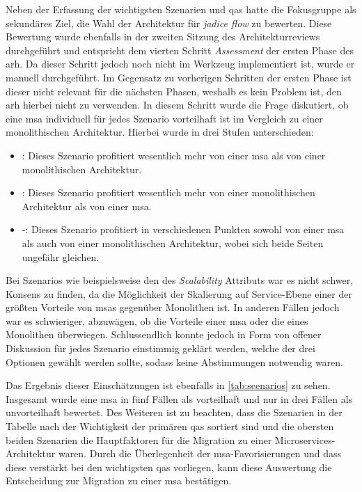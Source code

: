 Neben der Erfassung der wichtigsten Szenarien und \glspl{qa} hatte die Fokusgruppe als sekundäres Ziel, die Wahl der Architektur für \emph{jadice flow} zu bewerten.
Diese Bewertung wurde ebenfalls in der zweiten Sitzung des Architekturreviews durchgeführt und entspricht dem vierten Schritt \emph{Assessment} der ersten Phase des \gls{arh}.
Da dieser Schritt jedoch noch nicht im Werkzeug implementiert ist, wurde er manuell durchgeführt.
Im Gegensatz zu vorherigen Schritten der ersten Phase ist dieser nicht relevant für die nächsten Phasen, weshalb es kein Problem ist, den \gls{arh} hierbei nicht zu verwenden.
In diesem Schritt wurde die Frage diskutiert, ob eine \acrlong{msa} individuell für jedes Szenario vorteilhaft ist im Vergleich zu einer monolithischen Architektur.
Hierbei wurde in drei Stufen unterschieden:
\begin{itemize}
	\item \advantage\hspace*{0.1cm}: Dieses Szenario profitiert wesentlich mehr von einer \gls{msa} als von einer monolithischen Architektur.
	\item \disadvantage\hspace*{0.1cm}: Dieses Szenario profitiert wesentlich mehr von einer monolithischen Architektur als von einer \gls{msa}.
	\item \hspace*{0.27cm}-\hspace*{0.27cm}: Dieses Szenario profitiert in verschiedenen Punkten sowohl von einer \gls{msa} als auch von einer monolithischen Architektur, wobei sich beide Seiten ungefähr gleichen.
\end{itemize}
Bei Szenarios wie beispielsweise den des \emph{Scalability} Attributs war es nicht schwer, Konsens zu finden, da die Möglichkeit der Skalierung auf Service-Ebene einer der größten Vorteile von \glspl{msa} gegenüber Monolithen ist.
In anderen Fällen jedoch war es schwieriger, abzuwägen, ob die Vorteile einer \gls{msa} oder die eines Monolithen überwiegen.
Schlussendlich konnte jedoch in Form von offener  Diskussion für jedes Szenario einstimmig geklärt werden, welche der drei Optionen gewählt werden sollte, sodass keine Abstimmungen notwendig waren.

Das Ergebnis dieser Einschätzungen ist ebenfalls in \cref{tab:scenarios} zu sehen.
Insgesamt wurde eine \gls{msa} in fünf Fällen als vorteilhaft und nur in drei Fällen als unvorteilhaft bewertet.
Des Weiteren ist zu beachten, dass die Szenarien in der Tabelle nach der Wichtigkeit der primären \glspl{qa} sortiert sind und die obersten beiden Szenarien die Hauptfaktoren für die Migration zu einer Microservices-Architektur waren.
Durch die Überlegenheit der \gls{msa}-Favorisierungen und dass diese verstärkt bei den wichtigsten \glspl{qa} vorliegen, kann diese Auswertung die Entscheidung zur Migration zu einer \gls{msa} bestätigen.

